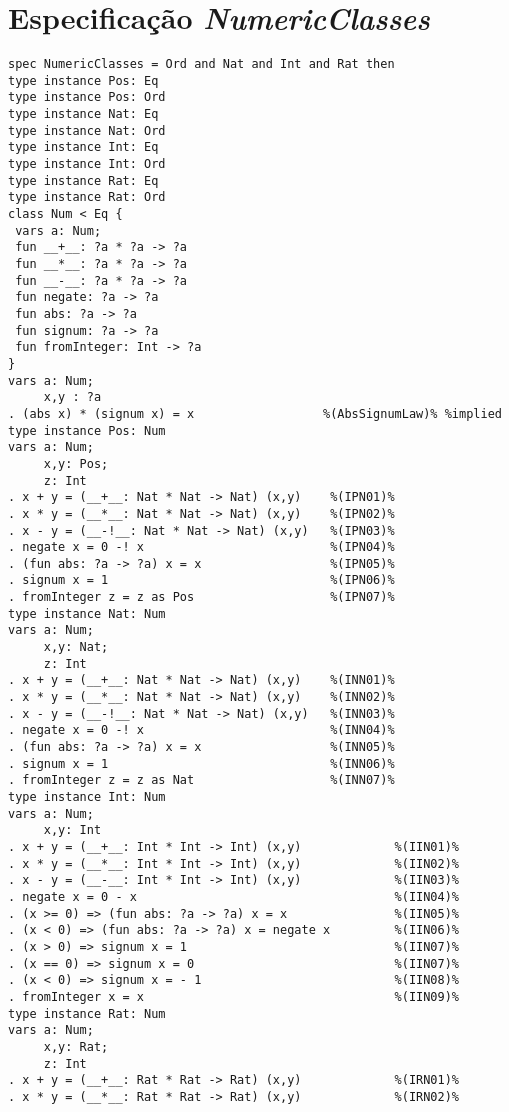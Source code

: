 \section{Especificação \textit{NumericClasses}}
\label{appendix:lazySpec:numericClasses}
\begin{Verbatim}
spec NumericClasses = Ord and Nat and Int and Rat then
type instance Pos: Eq
type instance Pos: Ord
type instance Nat: Eq
type instance Nat: Ord
type instance Int: Eq
type instance Int: Ord
type instance Rat: Eq
type instance Rat: Ord
class Num < Eq {
 vars a: Num;
 fun __+__: ?a * ?a -> ?a
 fun __*__: ?a * ?a -> ?a
 fun __-__: ?a * ?a -> ?a
 fun negate: ?a -> ?a
 fun abs: ?a -> ?a
 fun signum: ?a -> ?a
 fun fromInteger: Int -> ?a
}
vars a: Num;
     x,y : ?a
. (abs x) * (signum x) = x                  %(AbsSignumLaw)% %implied
type instance Pos: Num
vars a: Num;
     x,y: Pos;
     z: Int
. x + y = (__+__: Nat * Nat -> Nat) (x,y)    %(IPN01)%
. x * y = (__*__: Nat * Nat -> Nat) (x,y)    %(IPN02)%
. x - y = (__-!__: Nat * Nat -> Nat) (x,y)   %(IPN03)%
. negate x = 0 -! x                          %(IPN04)%
. (fun abs: ?a -> ?a) x = x                  %(IPN05)%
. signum x = 1                               %(IPN06)%
. fromInteger z = z as Pos                   %(IPN07)%
type instance Nat: Num
vars a: Num;
     x,y: Nat;
     z: Int
. x + y = (__+__: Nat * Nat -> Nat) (x,y)    %(INN01)%
. x * y = (__*__: Nat * Nat -> Nat) (x,y)    %(INN02)%
. x - y = (__-!__: Nat * Nat -> Nat) (x,y)   %(INN03)%
. negate x = 0 -! x                          %(INN04)%
. (fun abs: ?a -> ?a) x = x                  %(INN05)%
. signum x = 1                               %(INN06)%
. fromInteger z = z as Nat                   %(INN07)%
type instance Int: Num
vars a: Num;
     x,y: Int
. x + y = (__+__: Int * Int -> Int) (x,y)             %(IIN01)%
. x * y = (__*__: Int * Int -> Int) (x,y)             %(IIN02)%
. x - y = (__-__: Int * Int -> Int) (x,y)             %(IIN03)%
. negate x = 0 - x                                    %(IIN04)%
. (x >= 0) => (fun abs: ?a -> ?a) x = x               %(IIN05)%
. (x < 0) => (fun abs: ?a -> ?a) x = negate x         %(IIN06)%
. (x > 0) => signum x = 1                             %(IIN07)%
. (x == 0) => signum x = 0                            %(IIN07)%
. (x < 0) => signum x = - 1                           %(IIN08)%
. fromInteger x = x                                   %(IIN09)%
type instance Rat: Num
vars a: Num;
     x,y: Rat;
     z: Int
. x + y = (__+__: Rat * Rat -> Rat) (x,y)             %(IRN01)%
. x * y = (__*__: Rat * Rat -> Rat) (x,y)             %(IRN02)%

\end{Verbatim}
